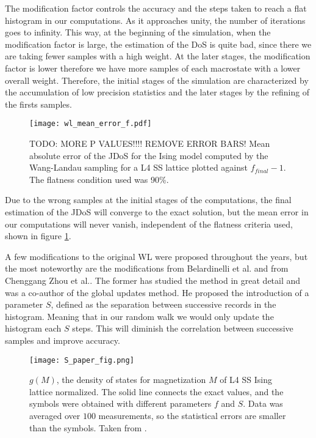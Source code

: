 The modification factor controls the accuracy and the steps taken to reach a flat histogram in our computations. As it approaches unity, the number of iterations goes to infinity. This way, at the beginning of the simulation, when the modification factor is large, the estimation of the DoS is quite bad, since there we are taking fewer samples with a high weight. At the later stages, the modification factor is lower therefore we have more samples of each macrostate with a lower overall weight. 
Therefore, the initial stages of the simulation are characterized by the accumulation of low precision statistics and the later stages by the refining of the firsts samples. 

\begin{figure}[h]
	\centering
	\texttt{[image: wl\_mean\_error\_f.pdf]}
	\caption{TODO: MORE P VALUES!!!! REMOVE ERROR BARS! Mean absolute error of the JDoS for the Ising model computed by the Wang-Landau sampling for a L4 SS lattice plotted against $f_{final}-1$. The flatness condition used was 90\%.}
	\label{error_abs_wl}
\end{figure}

Due to the wrong samples at the initial stages of the computations, the final estimation of the JDoS will converge to the exact solution, but the mean error in our computations will never vanish, independent of the flatness criteria used, shown in figure \ref{error_abs_wl}. 

A few modifications to the original WL were proposed throughout the years, but the most noteworthy  are the modifications from Belardinelli et al. and from Chenggang Zhou et al.. The former has studied the method in great detail and was a co-author of the global updates method. He proposed the introduction of a parameter $S$, defined as the separation between successive records in the histogram. Meaning that in our random walk we would only update the histogram each $S$ steps. This will diminish the correlation between successive samples and improve accuracy.  

\begin{figure}[h]
	\centering
	\texttt{[image: S\_paper\_fig.png]}
	\caption{$g(M)$, the density of states for magnetization $M$ of L4 SS Ising lattice normalized. The solid line connects the exact values, and the symbols were obtained with different parameters $f$ and $S$. Data was averaged over $100$ measurements, so the statistical errors are smaller than the symbols. Taken from .}
	\label{S_parameter}
\end{figure}

